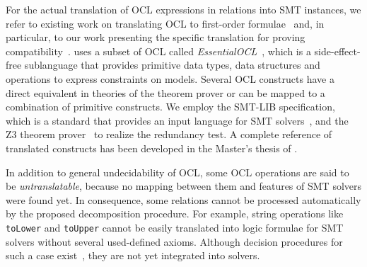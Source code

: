 
For the actual translation of \gls{OCL} expressions in \qvtr relations into \gls{SMT} instances, we refer to existing work on translating \gls{OCL} to first-order formulae~\cite{beckert2002ocltranslation} and, in particular, to our work presenting the specific translation for proving compatibility~.
\qvtr uses a subset of \gls{OCL} called \emph{EssentialOCL}~\cite{qvt}, which is a side-effect-free sublanguage that provides primitive data types, data structures and operations to express constraints on models.
Several \gls{OCL} constructs have a direct equivalent in theories of the theorem prover or can be mapped to a combination of primitive constructs.
We employ the SMT-LIB specification, which is a standard that provides an input language for \gls{SMT} solvers~\cite{smtlib2017}, and the Z3 theorem prover~\cite{z32008} to realize the redundancy test.
A complete reference of translated constructs has been developed in the Master's thesis of \textcite{pepin2019ma}.

In addition to general undecidability of \gls{OCL}, some \gls{OCL} operations are said to be \emph{untranslatable}, because no mapping between them and features of \gls{SMT} solvers were found yet.
In consequence, some \qvtr relations cannot be processed automatically by the proposed decomposition procedure.
For example, string operations like \texttt{toLower} and \texttt{toUpper} cannot be easily translated into logic formulae for \gls{SMT} solvers without several used-defined axioms.
Although decision procedures for such a case exist~\cite{veanes2012transducers}, they are not yet integrated into solvers.


